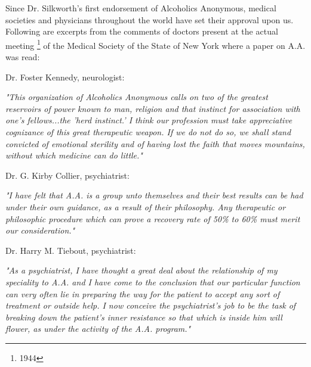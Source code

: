 

\bbChapterPreamble




\begin{biblechapter}
    Since Dr. Silkworth's first endorsement of Alcoholics Anonymous, 
    medical societies and physicians throughout the world 
    have set their approval upon us.
\verse Following are excerpts from the comments of doctors 
    present at the actual meeting
    \footnote{1944}
    of the Medical Society 
    of the State of New York where a paper on A.A. was read:

    Dr. Foster Kennedy, neurologist: 

\emph{"This organization of Alcoholics Anonymous 
    calls on two of the greatest reservoirs of power known to man, 
    religion and that instinct for association with one's fellows...the 
    'herd instinct.'
\verse I think our profession must take appreciative cognizance
    of this great therapeutic weapon.
\verse If we do not do so, 
    we shall stand convicted of emotional sterility 
    and of having lost the faith that moves mountains, 
    without which medicine can do little."
}

    Dr. G. Kirby Collier, psychiatrist: 

\emph{"I have felt that A.A. is a group unto themselves 
    and their best results can be had under their own guidance, 
    as a result of their philosophy.
\verse Any therapeutic or philosophic procedure 
    which can prove a recovery rate of 50\% to 60\% 
    must merit our consideration."
}

    Dr. Harry M. Tiebout, psychiatrist: 
    
\emph{"As a psychiatrist, 
    I have thought a great deal about the relationship 
    of my speciality to A.A. 
    and I have come to the conclusion that our particular function 
    can very often lie in preparing the way for the patient 
    to accept any sort of treatment or outside help.
\verse I now conceive the psychiatrist's job to be the task of 
    breaking down the patient's inner resistance 
    so that which is inside him will flower, 
    as under the activity of the A.A. program."
}
\end{biblechapter}


